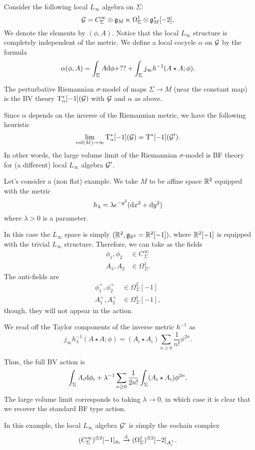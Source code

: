 \documentclass[11pt]{amsart}
\begin{document}
Consider the following local $L_\infty$ algebra on $\Sigma$:
\[
\mathcal G = C^\infty_\Sigma \otimes \mathfrak g_M \ltimes \Omega^1_\Sigma \otimes \mathfrak g_M^* [-2] ,
\]
We denote the elements by $(\phi, A)$. 
Notice that the local $L_\infty$ structure is completely independent of the metric.
We define a local cocycle $\alpha$ on $\mathcal G$ by the formula
\[
\alpha (\phi, A) = \int_\Sigma A {\rm d} \phi + ?? + \int_\Sigma j_\infty h^{-1} (A \star A ; \phi) .
\]

\begin{dfn}
The perturbative Riemannian $\sigma$-model of maps $\Sigma \to M$ (near the constant map) is the BV theory ${\rm T}^*_\alpha [-1](\mathcal G)$ with $\mathcal G$ and $\alpha$ as above. 
\end{dfn}

Since $\alpha$ depends on the inverse of the Riemannian metric, we have the following heuristic 
\[
\lim_{vol(M) \to \infty} {\rm T}^*_\alpha [-1](\mathcal G) = {\rm T}^* [-1](\mathcal G') .
\]
In other words, the large volume limit of the Riemannian $\sigma$-model is BF theory for (a different) local $L_\infty$ algebra $\mathcal G'$. 

\begin{eg}
Let's consider a (non flat) example.
We take $M$ to be affine space $\mathbb R^2$ equipped with the metric 
\[
h_\lambda = \lambda e^{-y^2} ({\rm d} x^2 + {\rm d} y^2) 
\]
where $\lambda > 0$ is a parameter.

In this case the $L_\infty$ space is simply $(\mathbb R^2, \mathfrak g_{\mathbb R^2} = \mathbb R^2 [-1])$, where $\mathbb R^2 [-1]$ is equipped with the trivial $L_\infty$ structure.
Therefore, we can take as the fields
\begin{align*}
\phi_1, \phi_2 & \in C^\infty_\Sigma \\
A_1 , A_2 & \in \Omega^1_\Sigma .
\end{align*}
The anti-fields are
\begin{align*}
\phi_1^+, \phi_2^+ & \in \Omega^2_\Sigma [-1] \\
A_1^+ , A_2^+ & \in \Omega^1_\Sigma [-1] ,
\end{align*}
though, they will not appear in the action. 

We read off the Taylor components of the inverse metric $h^{-1}$ as
\[
j_\infty h_\lambda^{-1} (A \star A ; \phi) = (A_i \star A_i) \sum_{n \geq 0} \frac{1}{n!} \phi^{2n} .
\]

Thus, the full BV action is 
\[
\int_\Sigma A_i {\rm d} \phi_i + \lambda^{-1} \sum_{n \geq 0} \frac{1}{2n!} \int_{\Sigma} (A_i \star A_i)  \phi^{2n} .
\]
The large volume limit corresponds to taking $\lambda \to 0$, in which case it is clear that we recover the standard BF type action.

In this example, the local $L_\infty$ algebra $\mathcal G'$ is simply the cochain complex 
\[
(C^\infty_\Sigma)^{\oplus 2} [-1]_{\phi_i} \xrightarrow{{\rm d}} (\Omega^1_\Sigma)^{\oplus 2} [-2]_{A_i^+} .
\]
\end{eg}
\end{document}
